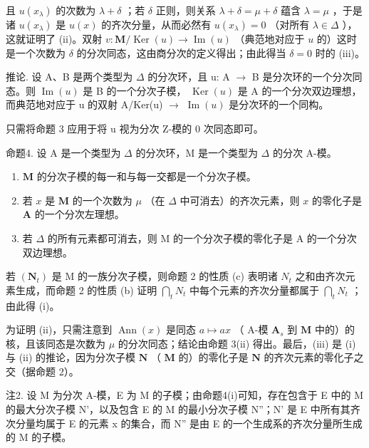 且 \(u(x_{\lambda})\) 的次数为 \(\lambda + \delta\) ；若 \(\delta\) 正则，则关系 \(\lambda + \delta = \mu + \delta\) 蕴含 \(\lambda = \mu\) ，于是诸 \(u(x_{\lambda})\) 是 \(u(x)\) 的齐次分量，从而必然有 \(u(x_{\lambda}) = 0\) （对所有 \(\lambda \in \Delta\) ），这就证明了 (ii)。双射 \(v: \mathbf{M} / \operatorname{Ker}(u) \to \operatorname{Im}(u)\) （典范地对应于 \(u\) 的）这时是一个次数为 \(\delta\) 的分次同态，这由商分次的定义得出；由此得当 \(\delta = 0\) 时的 (iii)。

推论. 设 A、B 是两个类型为 \(\Delta\) 的分次环，且 u: A \(\rightarrow\) B 是分次环的一个分次同态。则 \(\operatorname{Im}(u)\) 是 B 的一个分次子模， \(\operatorname{Ker}(u)\) 是 A 的一个分次双边理想，而典范地对应于 u 的双射 A/Ker(u) \(\rightarrow\) \(\operatorname{Im}(u)\) 是分次环的一个同构。

只需将命题 3 应用于将 u 视为分次 Z-模的 0 次同态即可。

命题4. 设 A 是一个类型为 \(\Delta\) 的分次环，M 是一个类型为 \(\Delta\) 的分次 A-模。

\begin{enumerate}
\def\labelenumi{(\roman{enumi})}
\item
  \(\mathbf{M}\) 的分次子模的每一和与每一交都是一个分次子模。
\item
  若 \(x\) 是 \(\mathbf{M}\) 的一个次数为 \(\mu\) （在 \(\Delta\) 中可消去）的齐次元素，则 \(x\) 的零化子是 \(\mathbf{A}\) 的一个分次左理想。
\item
  若 \(\Delta\) 的所有元素都可消去，则 M 的一个分次子模的零化子是 A 的一个分次双边理想。
\end{enumerate}

若 \((\mathbf{N}_{t})\) 是 M 的一族分次子模，则命题 2 的性质 (c) 表明诸 \(N_{t}\) 之和由齐次元素生成，而命题 2 的性质 (b) 证明 \(\bigcap_{t} N_{t}\) 中每个元素的齐次分量都属于 \(\bigcap_{t} N_{t}\) ；由此得 (i)。

为证明 (ii)，只需注意到 \(\operatorname{Ann}(x)\) 是同态 \(a \mapsto ax\) （ A-模 \(\mathbf{A}_s\) 到 \(\mathbf{M}\) 中的）的核，且该同态是次数为 \(\mu\) 的分次同态；结论由命题 3(ii) 得出。最后，(iii) 是 (i) 与 (ii) 的推论，因为分次子模 \(\mathbf{N}\) （ \(\mathbf{M}\) 的）的零化子是 \(\mathbf{N}\) 的齐次元素的零化子之交（据命题 2）。

注2. 设 M 为分次 A-模，E 为 M 的子模；由命题4(i)可知，存在包含于 E 中的 M 的最大分次子模 N'，以及包含 E 的 M 的最小分次子模 N''；N' 是 E 中所有其齐次分量均属于 E 的元素 x 的集合，而 N'' 是由 E 的一个生成系的齐次分量所生成的 M 的子模。

